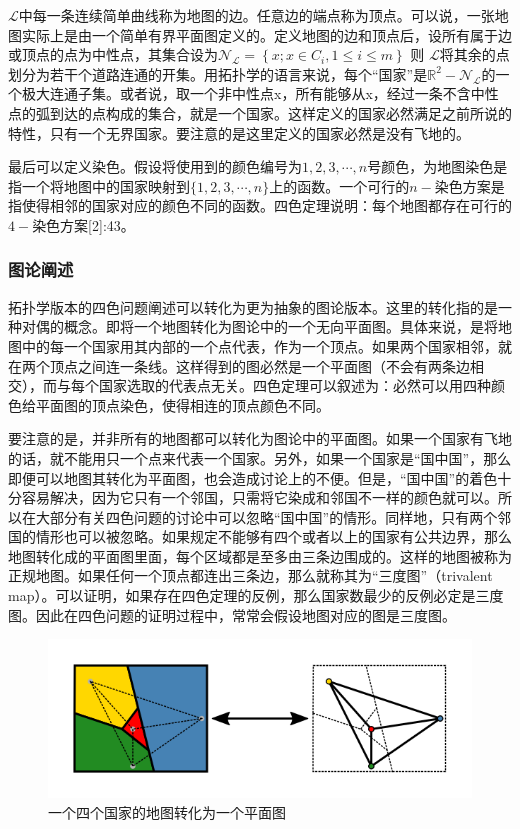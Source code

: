 \documentclass[12pt]{article} %
\begin{document}
$\mathcal{L}$中每一条连续简单曲线称为地图的边。任意边的端点称为顶点。可以说，一张地图实际上是由一个简单有界平面图定义的。定义地图的边和顶点后，设所有属于边或顶点的点为中性点，其集合设为$\mathcal{N}_{\mathcal{L}}=\left\{x ; x \in C_{i}, 1 \leqslant i \leqslant m\right\}$
则 $\mathcal{L}$将其余的点划分为若干个道路连通的开集。用拓扑学的语言来说，每个“国家”是$\mathbb{R}^{2}-\mathcal{N}_{\mathcal{L}}$的一个极大连通子集。或者说，取一个非中性点x，所有能够从x，经过一条不含中性点的弧到达的点构成的集合，就是一个国家。这样定义的国家必然满足之前所说的特性，只有一个无界国家。要注意的是这里定义的国家必然是没有飞地的。

最后可以定义染色。假设将使用到的颜色编号为$1,2,3,\cdots ,n$号颜色，为地图染色是指一个将地图中的国家映射到$\{1,2,3,\cdots ,n\}$上的函数。一个可行的$n-$染色方案是指使得相邻的国家对应的颜色不同的函数。四色定理说明：每个地图都存在可行的$4-$染色方案[2]:43。
\subsubsection{图论阐述}

拓扑学版本的四色问题阐述可以转化为更为抽象的图论版本。这里的转化指的是一种对偶的概念。即将一个地图转化为图论中的一个无向平面图。具体来说，是将地图中的每一个国家用其内部的一个点代表，作为一个顶点。如果两个国家相邻，就在两个顶点之间连一条线。这样得到的图必然是一个平面图（不会有两条边相交），而与每个国家选取的代表点无关。四色定理可以叙述为：必然可以用四种颜色给平面图的顶点染色，使得相连的顶点颜色不同\cite{rudo}。

要注意的是，并非所有的地图都可以转化为图论中的平面图。如果一个国家有飞地的话，就不能用只一个点来代表一个国家。另外，如果一个国家是“国中国”，那么即便可以地图其转化为平面图，也会造成讨论上的不便。但是，“国中国”的着色十分容易解决，因为它只有一个邻国，只需将它染成和邻国不一样的颜色就可以。所以在大部分有关四色问题的讨论中可以忽略“国中国”的情形。同样地，只有两个邻国的情形也可以被忽略。如果规定不能够有四个或者以上的国家有公共边界，那么地图转化成的平面图里面，每个区域都是至多由三条边围成的。这样的地图被称为正规地图。如果任何一个顶点都连出三条边，那么就称其为“三度图”（trivalent map）。可以证明，如果存在四色定理的反例，那么国家数最少的反例必定是三度图。因此在四色问题的证明过程中，常常会假设地图对应的图是三度图\cite{rudo}。
\begin{figure}[H]
\centering
\includegraphics[width=\textwidth]{Four_Colour_Planar_Graph.svg.png}
\caption{一个四个国家的地图转化为一个平面图}
\label{fig:fig1}
\end{figure}
\end{document}
